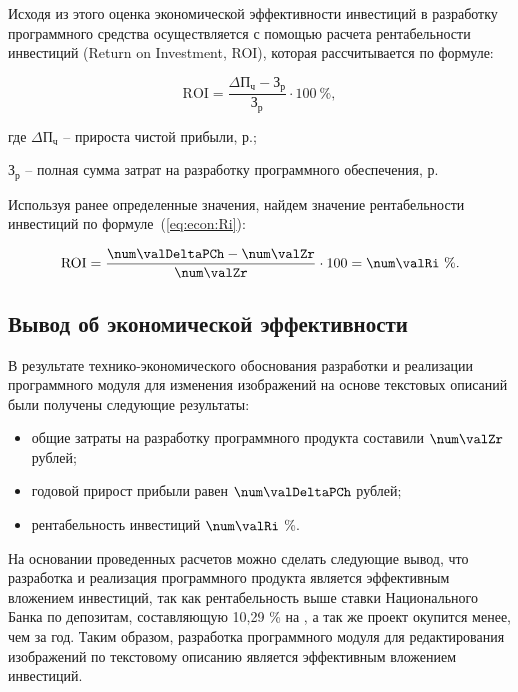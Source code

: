 Исходя из этого оценка экономической эффективности инвестиций в разработку 
программного средства осуществляется с помощью расчета рентабельности инвестиций (Return on Investment, ROI), которая рассчитывается по формуле:


\begin{equation}
  \label{eq:econ:Ri}
  \text{ROI} = \frac{\Delta \text{П}_\text{ч} - \text{З}_\text{р}}{\text{З}_\text{р}}
    \cdot 100 \ \%,
\end{equation}
\begin{explanationx}
  \item[где] $ \Delta \text{П}_\text{ч} $ -- прироста чистой прибыли, р.;
  \item $ \text{З}_\text{р} $ -- полная сумма затрат на разработку программного обеспечения, р.
\end{explanationx}


Используя ранее определенные значения, найдем значение рентабельности инвестиций по формуле~(\ref{eq:econ:Ri}):

\begin{equation}
  \label{eq:econ:RiCalc}
  \text{ROI} = \frac{\num\valDeltaPCh - \num\valZr}{\num\valZr}
    \cdot 100 = \num\valRi \ \%.
\end{equation}

\fixTableSectionSpace

\subsection{Вывод об экономической эффективности}

В результате технико-экономического обоснования разработки и 
реализации программного модуля для изменения изображений на основе текстовых описаний были получены следующие результаты:

\begin{itemize}
    \item общие затраты на разработку программного продукта составили $ \num\valZr $ рублей;
    \item годовой прирост прибыли равен $ \num\valDeltaPCh $ рублей;
    \item рентабельность инвестиций $ \num\valRi $ \%.
\end{itemize}

На основании проведенных расчетов можно сделать следующие вывод, что разработка и реализация программного продукта является эффективным вложением инвестиций, так как рентабельность выше ставки Национального Банка по депозитам, составляющую 10,29 \% на \econCalcDate, а так же проект окупится менее, чем за год. Таким образом, разработка программного модуля для 
редактирования изображений по текстовому описанию является эффективным вложением инвестиций.
